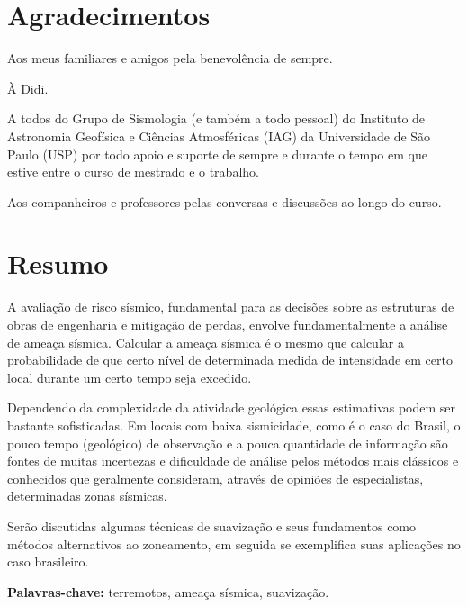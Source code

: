 \documentclass[12pt,twoside,a4paper]{book}
\numberwithin{equation}{section}
\begin{document}



\chapter*{Agradecimentos}
Aos meus familiares e amigos pela benevolência de sempre.

À Didi.

A todos do Grupo de Sismologia (e também a todo pessoal) do Instituto de
Astronomia Geofísica e Ciências Atmosféricas (IAG) da Universidade de São Paulo (USP) 
por todo apoio e suporte de sempre e durante o tempo em que
estive entre o curso de mestrado e o trabalho.

Aos companheiros e professores pelas conversas e discussões ao longo do curso.

\chapter*{Resumo}

A avaliação de risco sísmico, fundamental para as decisões sobre as estruturas de obras de engenharia
e mitigação de perdas, envolve fundamentalmente a análise de ameaça sísmica. 
Calcular a ameaça sísmica é o mesmo que calcular a probabilidade de que certo nível de 
determinada medida de intensidade em certo local durante um certo tempo seja excedido.

Dependendo da complexidade da atividade geológica essas estimativas podem ser bastante sofisticadas.
Em locais com baixa sismicidade, como é o caso do Brasil, o pouco tempo (geológico) de observação
e a pouca quantidade de informação são fontes de muitas incertezas e dificuldade de análise pelos métodos mais clássicos
e conhecidos que geralmente consideram, através de opiniões de especialistas, determinadas zonas sísmicas.

Serão discutidas algumas técnicas de suavização e seus fundamentos como métodos alternativos ao zoneamento,
em seguida se exemplifica suas aplicações no caso brasileiro.

\noindent \textbf{Palavras-chave:} terremotos, ameaça sísmica, suavização.

\end{document}
